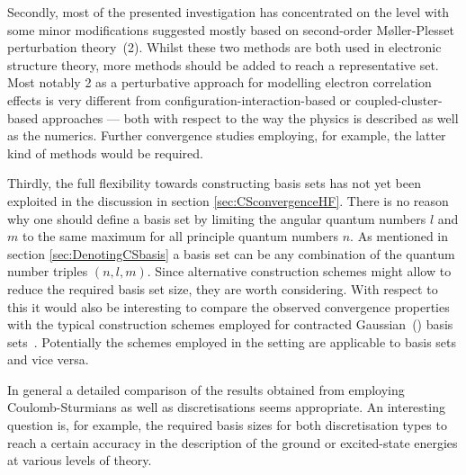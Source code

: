 Secondly, most of the presented investigation has concentrated on the \HF
level with some minor modifications suggested mostly based on
second-order Møller-Plesset perturbation theory~({\MP}2).
Whilst these two methods are both used in electronic structure theory,
more methods should be added to reach a representative set.
Most notably {\MP}2 as a perturbative approach
for modelling electron correlation effects is very different from
configuration-interaction-based
or coupled-cluster-based approaches
--- both with respect to the way the physics is described
as well as the numerics.
Further convergence studies employing, for example, the latter kind of methods
would be required.

Thirdly, the full flexibility towards constructing \CS basis sets has not yet
been exploited in the discussion in section \vref{sec:CSconvergenceHF}.
There is no reason why one should define a basis set
by limiting the angular quantum numbers $l$ and $m$ to the same maximum for all
principle quantum numbers $n$.
As mentioned in section \vref{sec:DenotingCSbasis} a \CS basis set can be any
combination of the quantum number triples $(n, l, m)$.
Since alternative construction schemes might allow to reduce
the required basis set size,
they are worth considering.
With respect to this it would also be interesting to compare the
observed convergence properties with the typical construction schemes
employed for contracted Gaussian~(\cGTO) basis sets~\cite{Jensen2013,Hill2013}.
Potentially the schemes employed in the \cGTO setting are applicable
to \CS basis sets and vice versa.

In general a detailed comparison of the results obtained
from employing Coulomb-Sturmians as well as \cGTO discretisations seems appropriate.
An interesting question is, for example, the required basis sizes for both
discretisation types to reach a certain accuracy
in the description of the ground or excited-state energies
at various levels of theory.

